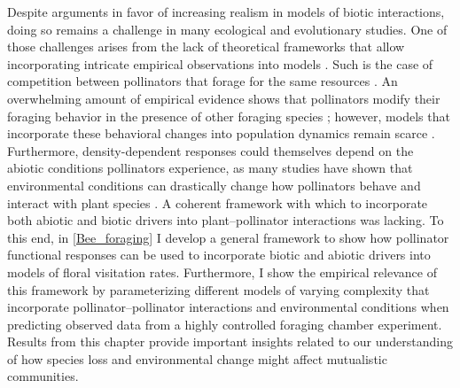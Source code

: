 \begin{refsection}
Despite arguments in favor of increasing realism in models of biotic interactions, doing so remains a challenge in many ecological and evolutionary studies. One of those challenges arises from the lack of theoretical frameworks that allow incorporating intricate empirical observations into models \citep{abrams1983arguments,abrams2001describing}.  Such is the case of competition between pollinators that forage for the same resources \citep{thomson_importance_2020}. An overwhelming amount of empirical evidence shows that pollinators modify their foraging behavior in the presence of other foraging species \citep{morse_resource_1977,inouye_resource_1978,thompson_dynamics_2006,brosi_single_2013,briggs_competitive_2016}; however, models that incorporate these behavioral changes into population dynamics remain scarce \citep{thomson_importance_2020}. Furthermore, density-dependent responses could themselves depend on the abiotic conditions pollinators experience, as many studies have shown that environmental conditions can drastically change how pollinators behave and interact with plant species \citep{heinrich_resource_1976,thomson_response_1987,cnaani_flower_2006,westphal_bumblebees_2006,briggs2018variation,classen2020specialization}. A coherent framework with which to incorporate both abiotic and biotic drivers into plant--pollinator interactions was lacking. To this end, in \autoref{Bee_foraging} I develop a general framework to show how pollinator functional responses can be used to incorporate biotic and abiotic drivers into models of floral visitation rates. Furthermore, I show the empirical relevance of this framework by parameterizing different models of varying complexity that incorporate pollinator--pollinator interactions and environmental conditions when predicting observed data from a highly controlled foraging chamber experiment. Results from this chapter provide important insights related to our understanding of how species loss and environmental change might affect mutualistic communities.



\end{refsection}
